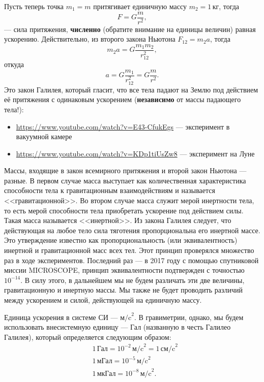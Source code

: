 \documentclass[11pt, a4paper]{article}
\theoremstyle{plain}
\theoremstyle{definition}
\theoremstyle{remark}
\begin{document}
Пусть теперь точка $m_1 = m$ притягивает единичную массу $m_2 = 1\,\text{кг}$, тогда
\begin{equation}
    F = G\dfrac{m}{r^2},
    \label{eq:dynamic}
\end{equation}
--- сила притяжения, \textbf{численно} (обратите внимание на единицы величин) равная ускорению.
Действительно, из второго закона Ньютона $F_{12} = m_2 a$, тогда
\begin{equation*}
    m_2 a = G\dfrac{m_1m_2}{r_{12}^2},
\end{equation*}
откуда 
\begin{equation}
    a = G\dfrac{m_1}{r_{12}^2} = G\dfrac{m}{r^2}.
    \label{eq:kinematic}
\end{equation}
Это закон Галилея, который гласит, что все тела падают на Землю под действием 
 её притяжения с одинаковым ускорением (\textbf{независимо} от массы падающего тела!):
\begin{itemize}
    \item \url{https://www.youtube.com/watch?v=E43-CfukEgs} --- эксперимент в вакуумной камере
    \item \url{https://www.youtube.com/watch?v=KDp1tiUsZw8} --- эксперимент на Луне
\end{itemize}
Массы, входящие в закон всемирного притяжения и второй закон Ньютона --- разные. В первом случае
масса выступает как количественная характеристика  способности тела к гравитационным
взаимодействиям и называется <<гравитационной>>. Во втором случае масса служит мерой инертности
тела, то есть мерой способности тела приобретать ускорение под действием силы. Такая масса
называется <<инертной>>. Из закона Галилея 
следует, что действующая  на  любое  тело  сила  тяготения  пропорциональна  его  инертной  массе.  Это
утверждение известно как пропорциональность (или эквивалентность) инертной и гравитационной масс
всех тел. Этот принцип проверялся множество раз в ходе экспериментов. Последний раз --- в 2017 году
с помощью спутниковой миссии MICROSCOPE, принцип эквивалентности подтвержден с точностью $10^{-14}$.
В силу этого, в дальнейшем мы не будем различать эти две величины, гравитационную и инертную массы.
Мы также не будет проводить различий между ускорением и силой, действующей на единичную массу.

Единица ускорения в системе СИ --- $\text{м/c}^2$. В гравиметрии, однако, мы будем
использовать внесистемную единицу --- Гал (названную в честь Галилео Галилея), который определяется
следующим образом:
\begin{align*}
    &1\,\text{Гал} = 10^{-2}\,\text{м/c}^2 = 1\,\text{см/c}^2\\
    &1\,\text{мГал} = 10^{-5}\,\text{м/c}^2 \\
    &1\,\text{мкГал} = 10^{-8}\,\text{м/c}^2. 
\end{align*}
\end{document}
